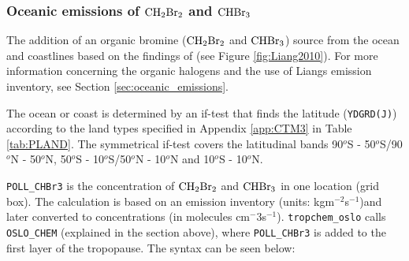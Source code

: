 \subsubsection{Oceanic emissions of $\mathrm{CH_2Br_2}$ and $\mathrm{CHBr_3}$}\label{sec:impl_ocean_source}

The addition of an organic bromine ($\mathrm{CH_2Br_2}$ and $\mathrm{CHBr_3}$) source from the ocean and coastlines based on the findings of \cite{Liang2010} (see Figure \ref{fig:Liang2010}). For more information concerning the organic halogens and the use of Liangs emission inventory, see Section \ref{sec:oceanic_emissions}.

\medskip

The ocean or coast is determined by an if-test that finds the latitude (\texttt{YDGRD(J)}) according to the land types specified in Appendix \ref{app:CTM3} in Table \ref{tab:PLAND}. The symmetrical if-test covers the latitudinal bands 90$^o$S - 50$^o$S/90$^o$N - 50$^o$N, 50$^o$S - 10$^o$S/50$^o$N - 10$^o$N and 10$^o$S - 10$^o$N. 

\medskip

\texttt{POLL\_CHBr3} is the concentration of $\mathrm{CH_2Br_2}$ and $\mathrm{CHBr_3}$ in one location (grid box). The calculation is based on an emission inventory  (units: kgm$^{-2}$s$^{-1}$)and later converted to concentrations (in molecules cm$^-{3}$s$^{-1}$). \texttt{tropchem\_oslo} calls \texttt{OSLO\_CHEM} (explained in the section above), where \texttt{POLL\_CHBr3} is added to the first layer of the tropopause. The syntax can be seen below:


